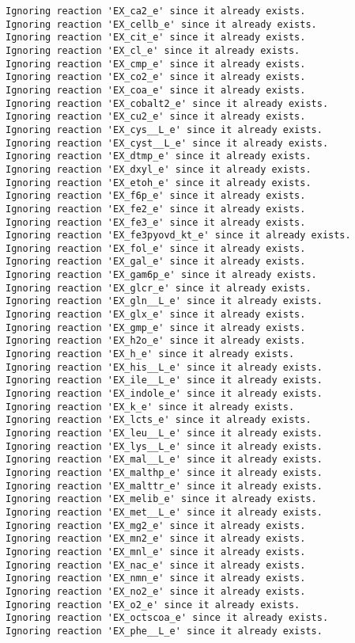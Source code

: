 \documentclass[
  letterpaper,
  DIV=11,
  numbers=noendperiod]{scrartcl}
\begin{document}
\begin{verbatim}
Ignoring reaction 'EX_ca2_e' since it already exists.
Ignoring reaction 'EX_cellb_e' since it already exists.
Ignoring reaction 'EX_cit_e' since it already exists.
Ignoring reaction 'EX_cl_e' since it already exists.
Ignoring reaction 'EX_cmp_e' since it already exists.
Ignoring reaction 'EX_co2_e' since it already exists.
Ignoring reaction 'EX_coa_e' since it already exists.
Ignoring reaction 'EX_cobalt2_e' since it already exists.
Ignoring reaction 'EX_cu2_e' since it already exists.
Ignoring reaction 'EX_cys__L_e' since it already exists.
Ignoring reaction 'EX_cyst__L_e' since it already exists.
Ignoring reaction 'EX_dtmp_e' since it already exists.
Ignoring reaction 'EX_dxyl_e' since it already exists.
Ignoring reaction 'EX_etoh_e' since it already exists.
Ignoring reaction 'EX_f6p_e' since it already exists.
Ignoring reaction 'EX_fe2_e' since it already exists.
Ignoring reaction 'EX_fe3_e' since it already exists.
Ignoring reaction 'EX_fe3pyovd_kt_e' since it already exists.
Ignoring reaction 'EX_fol_e' since it already exists.
Ignoring reaction 'EX_gal_e' since it already exists.
Ignoring reaction 'EX_gam6p_e' since it already exists.
Ignoring reaction 'EX_glcr_e' since it already exists.
Ignoring reaction 'EX_gln__L_e' since it already exists.
Ignoring reaction 'EX_glx_e' since it already exists.
Ignoring reaction 'EX_gmp_e' since it already exists.
Ignoring reaction 'EX_h2o_e' since it already exists.
Ignoring reaction 'EX_h_e' since it already exists.
Ignoring reaction 'EX_his__L_e' since it already exists.
Ignoring reaction 'EX_ile__L_e' since it already exists.
Ignoring reaction 'EX_indole_e' since it already exists.
Ignoring reaction 'EX_k_e' since it already exists.
Ignoring reaction 'EX_lcts_e' since it already exists.
Ignoring reaction 'EX_leu__L_e' since it already exists.
Ignoring reaction 'EX_lys__L_e' since it already exists.
Ignoring reaction 'EX_mal__L_e' since it already exists.
Ignoring reaction 'EX_malthp_e' since it already exists.
Ignoring reaction 'EX_malttr_e' since it already exists.
Ignoring reaction 'EX_melib_e' since it already exists.
Ignoring reaction 'EX_met__L_e' since it already exists.
Ignoring reaction 'EX_mg2_e' since it already exists.
Ignoring reaction 'EX_mn2_e' since it already exists.
Ignoring reaction 'EX_mnl_e' since it already exists.
Ignoring reaction 'EX_nac_e' since it already exists.
Ignoring reaction 'EX_nmn_e' since it already exists.
Ignoring reaction 'EX_no2_e' since it already exists.
Ignoring reaction 'EX_o2_e' since it already exists.
Ignoring reaction 'EX_octscoa_e' since it already exists.
Ignoring reaction 'EX_phe__L_e' since it already exists.

\end{verbatim}
\end{document}
